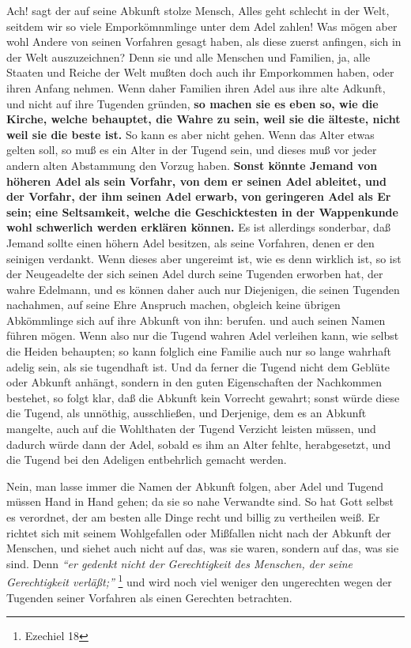 Ach! sagt der auf seine Abkunft stolze Mensch, Alles geht schlecht in der Welt,
seitdem wir so viele Emporkömnmlinge unter dem Adel
zahlen! Was mögen aber wohl
Andere von seinen Vorfahren gesagt haben, als diese zuerst anfingen, sich in der
Welt auszuzeichnen? Denn sie und alle Menschen und Familien, ja, alle Staaten
und Reiche der Welt mußten doch auch ihr Emporkommen haben, oder ihren Anfang
nehmen. Wenn daher Familien ihren Adel aus ihre alte Adkunft, und nicht auf ihre
Tugenden gründen, \label{ref:11_04_abstammung} \textbf{so machen sie es eben so, wie  die Kirche, welche behauptet,
die Wahre zu sein, weil sie die älteste, nicht weil sie die beste ist.} So kann
es aber nicht gehen. Wenn das Alter etwas gelten soll, so muß es ein Alter in
der Tugend sein, und dieses muß vor jeder andern alten Abstammung den Vorzug
haben. \textbf{Sonst könnte Jemand von höheren Adel als sein Vorfahr, von dem er
seinen
Adel ableitet, und der Vorfahr, der ihm seinen Adel erwarb, von geringeren Adel
als Er sein; eine Seltsamkeit, welche die Geschicktesten in der
Wappenkunde wohl
schwerlich werden erklären können.} Es ist allerdings sonderbar, daß Jemand
sollte einen höhern Adel besitzen, als seine Vorfahren, denen er den seinigen
verdankt. Wenn dieses aber ungereimt ist, wie es denn wirklich ist, so ist der
Neugeadelte der sich seinen Adel durch seine Tugenden erworben hat, der wahre
Edelmann, und es können daher auch nur Diejenigen, die seinen Tugenden
nachahmen, auf seine Ehre Anspruch machen, obgleich keine übrigen Abkömmlinge
sich auf ihre Abkunft von ihn: berufen. und auch seinen Namen führen mögen. Wenn
also nur die Tugend wahren Adel verleihen kann, wie selbst die
Heiden behaupten;
so kann folglich eine Familie auch nur so lange wahrhaft adelig sein, als sie
tugendhaft ist. Und da ferner die Tugend nicht dem Geblüte oder Abkunft anhängt,
sondern in den guten Eigenschaften der Nachkommen bestehet, so folgt klar, daß
die Abkunft kein Vorrecht gewahrt; sonst würde diese die Tugend, als unnöthig,
ausschließen, und Derjenige, dem es an Abkunft mangelte, auch auf die Wohlthaten
der Tugend Verzicht leisten müssen, und dadurch würde dann der Adel, sobald es
ihm an Alter fehlte, herabgesetzt, und die Tugend bei den Adeligen entbehrlich
gemacht werden.

\medskip

Nein, man lasse immer die Namen der Abkunft folgen, aber Adel und Tugend müssen
Hand in Hand gehen; da sie so nahe Verwandte sind. So hat Gott selbst es
verordnet, der am besten alle Dinge recht und billig zu vertheilen weiß. Er
richtet sich mit seinem Wohlgefallen oder Mißfallen nicht nach der Abkunft der
Menschen, und siehet auch nicht auf das, was sie waren, sondern auf das, was sie
sind. Denn
\textit{"`er gedenkt nicht der Gerechtigkeit des Menschen, der seine
Gerechtigkeit verläßt;"'}
\footnote{Ezechiel 18}
und wird noch viel weniger den
ungerechten wegen der Tugenden seiner Vorfahren als einen Gerechten betrachten.

